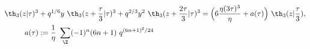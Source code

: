 \begin{equation}
    \begin{split}
\th_3(z|\tau)^3 &+ q^{1/6} y ~\th_3(z+\frac{\tau}{3} |\tau)^3
 + q^{2/3}  y^2 ~\th_3(z+{2\tau\over 3} |\tau)^3 = \Big( 6{\eta
    (3\tau)^3 \over\eta} +a(\tau)\Big)~\th_3(z|{\tau\over 3}), \\
  a(\tau) &:={1\over\eta}~\sum_\Z (-1)^n (6n+1) ~q^{(6n+1)^2 /24}
    \end{split}
  \end{equation}

